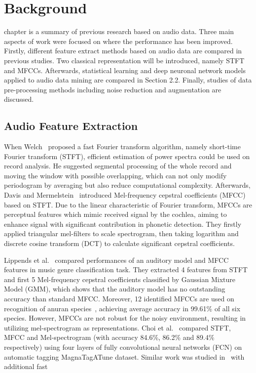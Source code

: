 \chapter{Background}
\renewcommand{\baselinestretch}{\mystretch}
 chapter is a summary of previous research based on audio data. Three main aspects of work were focused on where the performance has been improved. Firstly, different feature extract methods based on audio data are compared in previous studies. Two classical representation will be introduced, namely STFT and MFCCs. Afterwards, statistical learning and deep neuronal network models applied to audio data mining are compared in Section 2.2. Finally, studies of data pre-processing methods including noise reduction and augmentation are discussed. 
\section{Audio Feature Extraction}
When Welch~\cite{welch1967use} proposed a fast Fourier transform algorithm, namely short-time Fourier transform (STFT), efficient estimation of power spectra could be used on record analysis. He suggested segmental processing of the whole record and moving the window with possible overlapping, which can not only modify periodogram by averaging but also reduce computational complexity. Afterwards, Davis and Mermelstein~\cite{davis1980comparison} introduced Mel-frequency cepstral coefficients (MFCC) based on STFT. Due to the linear characteristic of Fourier transform, MFCCs are perceptual features which mimic received signal by the cochlea, aiming to enhance signal with significant contribution in phonetic detection. They firstly applied triangular mel-filters to scale spectrogram, then taking logarithm and discrete cosine transform (DCT) to calculate significant cepstral coefficients. \par
Lippends et al.~\cite{lippens2004comparison} compared performances of an auditory model and MFCC features in music genre classification task. They extracted 4 features from STFT and first 5 Mel-frequency cepstral coefficients classified by Gaussian Mixture Model (GMM), which shows that the auditory model has no outstanding accuracy than standard MFCC. Moreover, 12 identified MFCCs are used on recognition of anuran species~\cite{bedoya2014automatic}, achieving average accuracy in 99.61\% of all six species. However, MFCCs are not robust for the noisy environment, resulting in utilizing mel-spectrogram as representations. Choi et al.~\cite{choi2016automatic} compared STFT, MFCC and Mel-spectrogram (with accuracy 84.6\%, 86.2\% and 89.4\% respectively) using four layers of fully convolutional neural networks (FCN) on automatic tagging MagnaTagATune dataset. Similar work was studied in~\cite{huzaifah2017comparison} with additional fast
